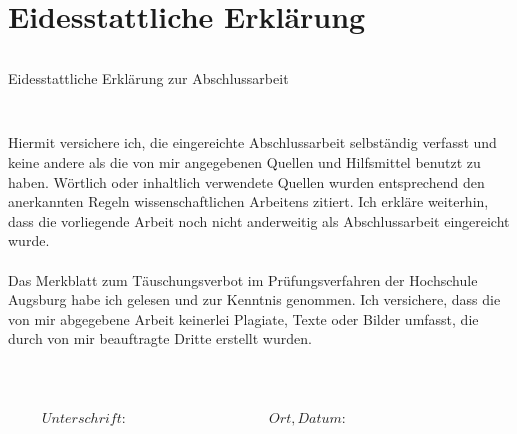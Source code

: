 \newpage

\section*{Eidesstattliche Erklärung}
\thispagestyle{empty}

\begin{verbatim}

\end{verbatim}

\begin{LARGE}
\begin{center}
	Eidesstattliche Erklärung zur Abschlussarbeit
\end{center}
\end{LARGE}
\begin{verbatim}


\end{verbatim}
Hiermit versichere ich, die eingereichte Abschlussarbeit selbständig verfasst und
keine andere als die von mir angegebenen Quellen und Hilfsmittel benutzt zu haben.
Wörtlich oder inhaltlich verwendete Quellen wurden entsprechend den anerkannten
Regeln wissenschaftlichen Arbeitens zitiert. Ich erkläre weiterhin, dass die
vorliegende Arbeit noch nicht anderweitig als Abschlussarbeit eingereicht wurde.
\\
\\
Das Merkblatt zum Täuschungsverbot im Prüfungsverfahren der Hochschule
Augsburg habe ich gelesen und zur Kenntnis genommen. Ich versichere, dass die
von mir abgegebene Arbeit keinerlei Plagiate, Texte oder Bilder umfasst, die durch
von mir beauftragte Dritte erstellt wurden.
\begin{verbatim}



\end{verbatim}


\begin{displaymath}
\begin{array}{ll}
Unterschrift:~~~~~~~~~~~~~~~~~~~~~~~~~~~~~~~~~~~~~~~~~~
& Ort, Datum:~~~~~~~~~~~~~~~~~~~~~~~~~~~~~~~~~~~~~~~~~~
\end{array}
\end{displaymath}